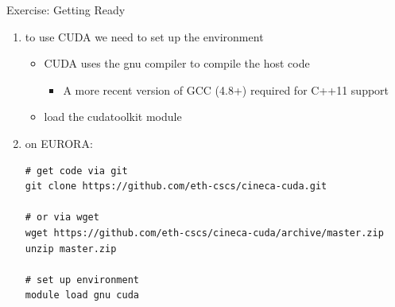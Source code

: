 \begin{frame}[fragile]{Exercise: Getting Ready}
    \begin{enumerate}
        \item to use CUDA we need to set up the environment
        \begin{itemize}
            \item CUDA uses the gnu compiler to compile the host code
            \begin{itemize}
                \item A more recent version of GCC (4.8+) required for C++11 support
            \end{itemize}
            \item load the cudatoolkit module
        \end{itemize}
    \vspace{-5pt}

        \item on EURORA:
\begin{lstlisting}[style=terminal]
# get code via git
git clone https://github.com/eth-cscs/cineca-cuda.git

# or via wget
wget https://github.com/eth-cscs/cineca-cuda/archive/master.zip
unzip master.zip

# set up environment
module load gnu cuda
\end{lstlisting}

    \end{enumerate}

\end{frame}
